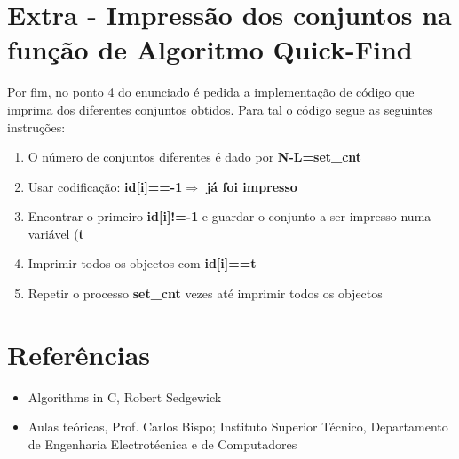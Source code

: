 \documentclass[10pt,a4paper]{article}
\begin{document}
\section{Extra - Impressão dos conjuntos na função de Algoritmo Quick-Find}
\par Por fim, no ponto 4 do enunciado é pedida a implementação de código que imprima dos diferentes conjuntos obtidos. Para tal o código segue as seguintes instruções:

\begin{enumerate}
\item O número de conjuntos diferentes é dado por \textbf{N-L=set\_cnt}
\item Usar codificação: \textbf{id[i]==-1$\Rightarrow$ já foi impresso}
\item Encontrar o primeiro \textbf{id[i]!=-1} e guardar o conjunto a ser impresso numa variável (\textbf{t}
\item Imprimir todos os objectos com \textbf{id[i]==t}
\item Repetir o processo \textbf{set\_cnt} vezes até imprimir todos os objectos
\end{enumerate}




\vskip 10cm
\section{Referências}
\begin{itemize}
\item Algorithms in C, Robert Sedgewick
\item Aulas teóricas, Prof. Carlos Bispo; Instituto Superior Técnico, Departamento de Engenharia Electrotécnica e de Computadores
\end{itemize}
\end{document}
